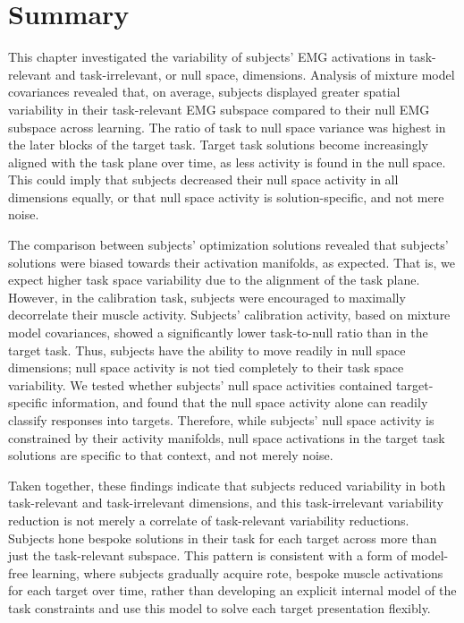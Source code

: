 \documentclass[../main.tex]{subfiles}
\begin{document}
  \section{Summary}

  This chapter investigated the variability of subjects' EMG activations in task-relevant and task-irrelevant, or null space, dimensions. Analysis of mixture model covariances revealed that, on average, subjects displayed greater spatial variability in their task-relevant EMG subspace compared to their null EMG subspace across learning. The ratio of task to null space variance was highest in the later blocks of the target task. Target task solutions become increasingly aligned with the task plane over time, as less activity is found in the null space. This could imply that subjects decreased their null space activity in all dimensions equally, or that null space activity is solution-specific, and not mere noise.  
  
  The comparison between subjects' optimization solutions revealed that subjects' solutions were biased towards their activation manifolds, as expected. That is, we expect higher task space variability due to the alignment of the task plane. However, in the calibration task, subjects were encouraged to maximally decorrelate their muscle activity. Subjects' calibration activity, based on mixture model covariances, showed a significantly lower task-to-null ratio than in the target task. Thus, subjects have the ability to move readily in null space dimensions; null space activity is not tied completely to their task space variability. We tested whether subjects' null space activities contained target-specific information, and found that the null space activity alone can readily classify responses into targets. Therefore, while subjects' null space activity is constrained by their activity manifolds, null space activations in the target task solutions are specific to that context, and not merely noise.
  
  Taken together, these findings indicate that subjects reduced variability in both task-relevant and task-irrelevant dimensions, and this task-irrelevant variability reduction is not merely a correlate of task-relevant variability reductions. Subjects hone bespoke solutions in their task for each target across more than just the task-relevant subspace. This pattern is consistent with a form of model-free learning, where subjects gradually acquire rote, bespoke muscle activations for each target over time, rather than developing an explicit internal model of the task constraints and use this model to solve each target presentation flexibly.
  
  \ifSubfilesClassLoaded{%
      \newpage%
  }{}%
  
\end{document}
